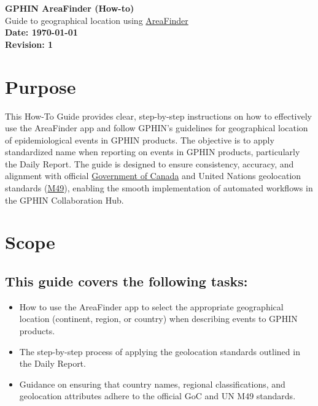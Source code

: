 \documentclass[a4paper,12pt]{article}
\begin{document}
\vspace{10.cm}
\begin{titlepage}
    \centering
    \vspace{1cm}
    {\Huge \textbf{GPHIN AreaFinder (How-to)}}\\
    \vspace{0.5cm}
    {\Large  Guide to geographical location using \href{https://areafinder.streamlit.app/}{AreaFinder}}\\
    \vspace{1cm}
    \textbf{Date: \today}\\
    \textbf{Revision: 1}
\end{titlepage}
\clearpage

\tableofcontents
\clearpage


\section{Purpose}
This How-To Guide provides clear, step-by-step instructions on how to effectively use the AreaFinder app and follow GPHIN's guidelines for geographical location of epidemiological events in GPHIN products. The objective is to apply standardized name when reporting on events in GPHIN products, particularly the Daily Report. The guide is designed to ensure consistency, accuracy, and alignment with official \href{https://www.canada.ca/en/government/system/digital-government/digital-government-innovations/enabling-interoperability/gc-enterprise-data-reference-standards/current-past-official-names-countries-territories-geographic-areas.html}{Government of Canada} and United Nations geolocation standards (\href{https://unstats.un.org/unsd/methodology/m49/}{M49}), enabling the smooth implementation of automated workflows in the GPHIN Collaboration Hub.


\section{Scope}
\subsection{This guide covers the following tasks:}
\begin{itemize}

    \item How to use the AreaFinder app to select the appropriate geographical location (continent, region, or country) when describing events to GPHIN products.
    \item The step-by-step process of applying the geolocation standards outlined in the Daily Report.
    \item Guidance on ensuring that country names, regional classifications, and geolocation attributes adhere to the official GoC and UN M49 standards.

\end{itemize}
\end{document}

